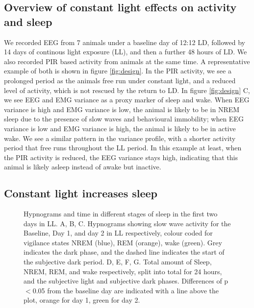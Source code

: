 

\subsection{Overview of constant light effects on activity and sleep}
We recorded EEG from 7 animals under a baseline day of 12:12 LD, followed by
14 days of continous light exposure (LL), and then a further 48 hours of LD.
We also recorded PIR based activity from animals at the same time.
A representative example of both is shown in figure \ref{fig:design}.
In the PIR activity, we see a prolonged period as the animals free run under
constant light, and a reduced level of activity, which is not rescued by the
return to LD.
In figure \ref{fig:design} C, we see EEG and EMG variance as a proxy marker
of sleep and wake.
When EEG variance is high and EMG variance is low, the animal is likely to be
in NREM sleep due to the presence of slow waves and behavioural immobility;
when EEG variance is low and EMG variance is high, the animal
is likely to be in active wake.
We see a similar pattern in the variance profile, with a shorter activity
period that free runs throughout the LL period.
In this example at least, when the PIR activity is reduced, the EEG variance
stays high, indicating that this animal is likely asleep instead of
awake but inactive.

\subsection{Constant light increases sleep}
\begin{landscape}
\begin{figure}[p]
    \centering
\caption[Hypnograms]{
Hypnograms and time in different stages of sleep in the first two days in LL.
A, B, C.
Hypnograms showing slow wave activity for the Baseline, Day 1, and day 2 in LL
respectively,
colour coded for vigilance states NREM (blue), REM (orange), wake (green).
Grey indicates the dark phase, and the dashed line indicates the start of the
subjective dark period.
D, E, F, G.
Total amount of Sleep, NREM, REM, and wake respectively, split into total for
24 hours, and the subjective light and subjective dark phases.
Differences of p$<$0.05 from the baseline day are indicated with a 
line above the plot, orange for day 1, green for day 2.
}
    \label{fig:hypnogram}
\end{figure}
\end{landscape}

